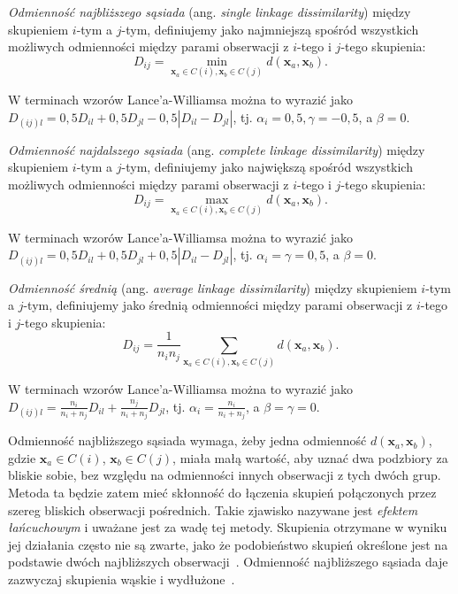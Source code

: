 \documentclass{praca1}
\begin{document}
\begin{definition}
\emph{Odmienność najbliższego sąsiada} (ang. \emph{single linkage dissimilarity}) między skupieniem $i$-tym a $j$-tym, definiujemy jako najmniejszą spośród wszystkich możliwych odmienności między parami obserwacji z $i$-tego i $j$-tego skupienia:
$$
D_{ij} = \min\limits_{\mathbf{x}_a \in C(i), \mathbf{x}_b \in C(j)}d(\mathbf{x}_a, \mathbf{x}_b).
$$
\end{definition}

W terminach wzorów Lance'a-Williamsa można to wyrazić jako $D_{(ij)l} = 0,5 D_{il} + 0,5 D_{jl} - 0,5 |D_{il} - D_{jl}| $, tj. $\alpha_i = 0,5, \gamma = -0,5$, a $\beta = 0$.

\begin{definition}
\emph{Odmienność najdalszego sąsiada} (ang. \emph{complete linkage dissimilarity}) między skupieniem $i$-tym a $j$-tym, definiujemy jako największą spośród wszystkich możliwych odmienności między parami obserwacji z $i$-tego i $j$-tego skupienia:
$$
D_{ij} = \max\limits_{\mathbf{x}_a \in C(i), \mathbf{x}_b \in C(j)}d(\mathbf{x}_a, \mathbf{x}_b).
$$
\end{definition}

W terminach wzorów Lance'a-Williamsa można to wyrazić jako $D_{(ij)l} = 0,5 D_{il} + 0,5 D_{jl} + 0,5 |D_{il} - D_{jl}| $, tj. $\alpha_i = \gamma = 0,5$, a $\beta = 0$.

\begin{definition}
\emph{Odmienność średnią} (ang. \emph{average linkage dissimilarity}) między skupieniem $i$-tym a $j$-tym, definiujemy jako średnią odmienności między parami obserwacji z $i$-tego i $j$-tego skupienia:
$$
D_{ij} = \frac{1}{n_i n_j}\sum\limits_{\mathbf{x}_a \in C(i), \mathbf{x}_b \in C(j)}d(\mathbf{x}_a, \mathbf{x}_b).
$$
\end{definition}

W terminach wzorów Lance'a-Williamsa można to wyrazić jako $D_{(ij)l} = \frac{n_i}{n_i+n_j} D_{il} + \frac{n_j}{n_i+n_j} D_{jl}$, tj. $\alpha_i = \frac{n_i}{n_i+n_j}$, a $\beta = \gamma = 0$.

Odmienność najbliższego sąsiada wymaga, żeby jedna odmienność $d(\mathbf{x}_a, \mathbf{x}_b)$, gdzie $\mathbf{x}_a \in C(i)$, $\mathbf{x}_b \in C(j)$, miała małą wartość, aby uznać dwa podzbiory za bliskie sobie, bez względu na odmienności innych obserwacji z tych dwóch grup. Metoda ta będzie zatem mieć skłonność do łączenia skupień połączonych przez szereg bliskich obserwacji pośrednich. Takie zjawisko nazywane jest \emph{efektem łańcuchowym} i uważane jest za wadę tej metody. Skupienia otrzymane w wyniku jej działania często nie są zwarte, jako że podobieństwo skupień określone jest na podstawie dwóch najbliższych obserwacji~\cite{Hastie2009:elements}. Odmienność najbliższego sąsiada daje zazwyczaj skupienia wąskie i wydłużone~\cite{Koronacki2005:statystyczne}. 
\end{document}
